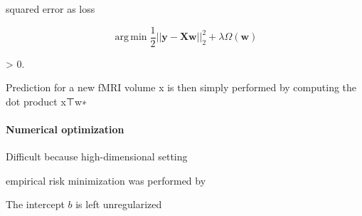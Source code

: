 \documentclass{article} %
\DeclareMathOperator*{\argmin}{arg\,min}
\DeclareMathOperator{\argmin}{argmin}
\begin{document}
squared error as loss

\begin{equation}
  \argmin \frac{1}{2}||\mathbf{y - Xw}||_2^2 + \lambda\Omega(\mathbf{w})
\end{equation}

\lambda > 0.

Prediction for a new fMRI volume x is then simply performed by computing
the dot product x⊤w∗

\paragraph{Numerical optimization}

Difficult because high-dimensional setting

empirical risk minimization was performed by


The intercept $b$ is left unregularized
\end{document}
